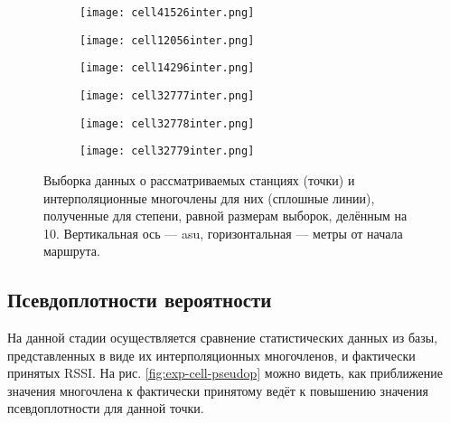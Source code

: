 \begin{figure}[p]
	\begin{center}
		\begin{subfigure}[b]{1\textwidth}
			\texttt{[image: cell41526inter.png]}
		\end{subfigure}

		\begin{subfigure}[b]{0.45\textwidth}
			\texttt{[image: cell12056inter.png]}
		\end{subfigure}
		\begin{subfigure}[b]{0.45\textwidth}
			\texttt{[image: cell14296inter.png]}
		\end{subfigure}

		\begin{subfigure}[b]{0.3\textwidth}
			\texttt{[image: cell32777inter.png]}
		\end{subfigure}
		\begin{subfigure}[b]{0.3\textwidth}
			\texttt{[image: cell32778inter.png]}
		\end{subfigure}
		\begin{subfigure}[b]{0.3\textwidth}
			\texttt{[image: cell32779inter.png]}
		\end{subfigure}
	\end{center}
	\caption{Выборка данных о рассматриваемых станциях (точки) и интерполяционные многочлены для них (сплошные линии), полученные для степени, равной размерам выборок, делённым на 10. Вертикальная ось --- asu, горизонтальная --- метры от начала маршрута.}
	\label{fig:exp-cell-inter}
\end{figure}

\subsection{Псевдоплотности вероятности}

На данной стадии осуществляется сравнение статистических данных из базы, представленных в виде их интерполяционных многочленов, и фактически принятых RSSI. На рис. \ref{fig:exp-cell-pseudop} можно видеть, как приближение значения многочлена к фактически принятому ведёт к повышению значения псевдоплотности для данной точки.

